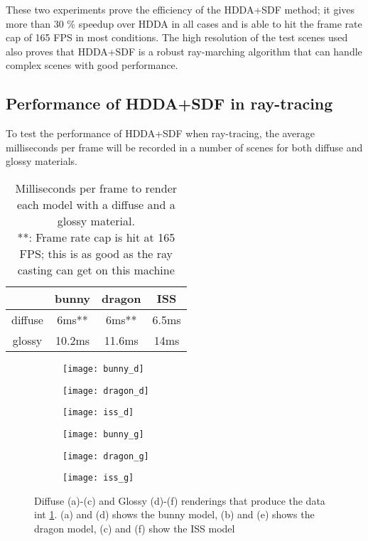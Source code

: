 These two experiments prove the efficiency of the HDDA+SDF method; it gives more than 30 \% speedup over HDDA in all cases and is able to hit the frame rate cap of 165 FPS in most conditions. The high resolution of the test scenes used also proves that HDDA+SDF is a robust ray-marching algorithm that can handle complex scenes with good performance.

\subsection{Performance of HDDA+SDF in ray-tracing}

To test the performance of HDDA+SDF when ray-tracing, the average milliseconds per frame will be recorded in a number of scenes for both diffuse and glossy materials.

\begin{table}[h]
  \centering
  \begin{tabular}{|c||c|c|c|}
    \hline
    & bunny & dragon & ISS \\
    \hline
    diffuse & 6ms** & 6ms** & 6.5ms \\
    \hline
    glossy & 10.2ms & 11.6ms & 14ms \\
    \hline
  \end{tabular}
  \caption[Diffuse and glossy rendering times for bunny, dragon and ISS]{Milliseconds per frame to render each model with a diffuse and a glossy material. \\
    **: Frame rate cap is hit at 165 FPS; this is as good as the ray casting can get on this machine}
  \label{sdf_test}
\end{table}


\begin{figure}[H]
  \centering
  \begin{subfigure}[b]{0.32\textwidth}
    \texttt{[image: bunny\_d]}
    \caption{}
  \end{subfigure}
  \hfill
  \begin{subfigure}[b]{0.32\textwidth}
    \texttt{[image: dragon\_d]}
    \caption{}
  \end{subfigure}
  \hfill
  \begin{subfigure}[b]{0.32\textwidth}
    \texttt{[image: iss\_d]}
    \caption{}
  \end{subfigure}
  \hfill
  \begin{subfigure}[b]{0.32\textwidth}
    \texttt{[image: bunny\_g]}
    \caption{}
  \end{subfigure}
  \hfill
  \begin{subfigure}[b]{0.32\textwidth}
    \texttt{[image: dragon\_g]}
    \caption{}
  \end{subfigure}
  \hfill
  \begin{subfigure}[b]{0.32\textwidth}
    \texttt{[image: iss\_g]}
    \caption{}
  \end{subfigure}
  \caption[Diffuse and glossy renders]{Diffuse (a)-(c) and Glossy (d)-(f) renderings that produce the data int \cref{sdf_test}. (a) and (d) shows the bunny model, (b) and (e) shows the dragon model, (c) and (f) show the ISS model}
\end{figure}

